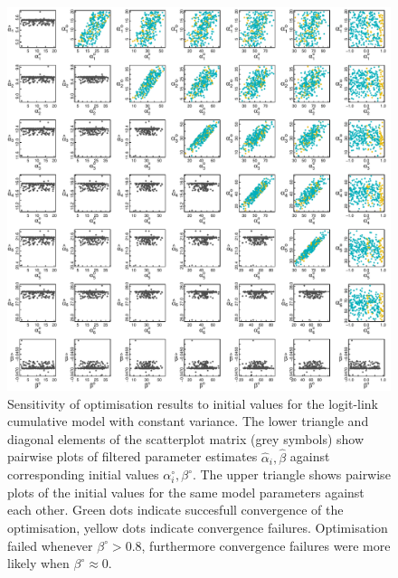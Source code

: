 \begin{figure}[p]
  \centering
  \includegraphics[width=\textwidth]{../figures/figS2_initial_value_sensitivity_logit.pdf}
  \caption{Sensitivity of optimisation results to initial values for the logit-link cumulative model with constant variance. The lower triangle and diagonal elements of the scatterplot matrix (grey symbols) show pairwise plots of filtered parameter estimates $\hat{\alpha}_i, \hat{\beta}$  against corresponding initial values $\alpha^{\circ}_i, \beta^{\circ}$. The upper triangle shows pairwise plots of the initial values for the same model parameters against each other. Green dots indicate succesfull convergence of the optimisation, yellow dots indicate convergence failures. Optimisation failed whenever $\beta^{\circ}>0.8$, furthermore convergence failures were more likely when $\beta^{\circ}\approx 0$.}
  \label{fig:fig4}
\end{figure} 

